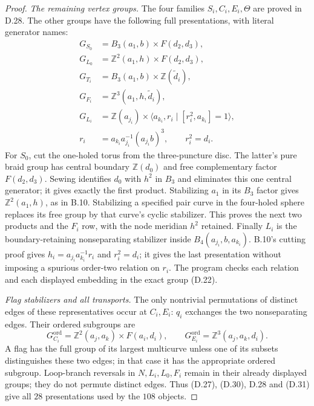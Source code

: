 \begin{proof}
\emph{The remaining vertex groups.}
The four families $S_i,C_i,E_i,\Theta$ are proved in
D.28.  The other groups have the following full
presentations, with literal generator names:
\[
\begin{aligned}
 G_{S_0}&=B_3(a_1,b)\times F(d_2,d_3),\\
 G_{L_0}&=\mathbb Z^2(a_1,h)\times F(d_2,d_3),\\
 G_{T_i}&=B_3(a_1,b)\times\mathbb Z(\widetilde d_i),\\
 G_{F_i}&=\mathbb Z^3(a_1,h,\widetilde d_i),\\
 G_{L_i}&=\mathbb Z(a_{j_i})\times
       \langle a_{k_i},r_i\mid[r_i^2,a_{k_i}]=1\rangle,\\
 r_i&=a_{k_i}a_{j_i}^{-1}(a_{j_i}b)^3,
                       \qquad r_i^2=d_i.
\end{aligned}                                                     \tag{D.30}
\]
For $S_0$, cut the one-holed torus from the three-puncture
disc.  The latter's pure braid group has central boundary
$\mathbb Z(d_0)$ and free complementary factor
$F(d_2,d_3)$.  Sewing identifies $d_0$ with $h^2$ in
$B_3$ and eliminates this one central generator; it gives
exactly the first product.  Stabilizing $a_1$ in its
$B_3$ factor gives $\mathbb Z^2(a_1,h)$, as in B.10.
Stabilizing a specified pair curve in the four-holed
sphere replaces its free group by that curve's cyclic
stabilizer.  This proves the next two products and the
$F_i$ row, with the node meridian $h^2$ retained.
Finally $L_i$ is the boundary-retaining nonseparating
stabilizer inside $B_4(a_{j_i},b,a_{k_i})$.
B.10's cutting proof gives
$h_i=a_{j_i}a_{k_i}^{-1}r_i$ and $r_i^2=d_i$;
it gives the last presentation without imposing a
spurious order-two relation on $r_i$.
The program checks each relation and each displayed
embedding in the exact group (D.22).

\emph{Flag stabilizers and all transports.}
The only nontrivial permutations of distinct edges of
these representatives occur at $C_i,E_i$: $q_i$ exchanges
the two nonseparating edges.  Their ordered subgroups are
\[
 G_{C_i}^{\mathrm{ord}}
    =\mathbb Z^2(a_j,a_k)\times F(a_i,d_i),\qquad
 G_{E_i}^{\mathrm{ord}}=\mathbb Z^3(a_j,a_k,d_i).          \tag{D.31}
\]
A flag has the full group of its largest multicurve
unless one of its subsets distinguishes these two edges;
in that case it has the appropriate ordered subgroup.
Loop-branch reversals in $N,L_i,L_0,F_i$ remain in their
already displayed groups; they do not permute distinct
edges.  Thus (D.27), (D.30), D.28 and (D.31) give all
$28$ presentations used by the $108$ objects.


\end{proof}
